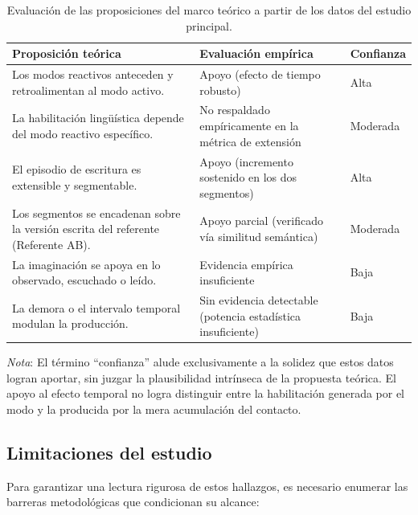 \documentclass[12pt]{article}
\begin{document}
	\begin{table}[htbp]
		\centering
		\caption{Evaluación de las proposiciones del marco teórico a partir de los datos del estudio principal.}
		\label{tab:matriz_principal}
		\small
		\begin{tabular}{p{} p{} p{}}
			\toprule
			\textbf{Proposición teórica} & \textbf{Evaluación empírica} & \textbf{Confianza} \\
			\midrule
			Los modos reactivos anteceden y retroalimentan al modo activo. &
			Apoyo (efecto de tiempo robusto) & Alta \\[2pt]
			La habilitación lingüística depende del modo reactivo específico. &
			No respaldado empíricamente en la métrica de extensión & Moderada \\[2pt]
			El episodio de escritura es extensible y segmentable. &
			Apoyo (incremento sostenido en los dos segmentos) & Alta \\[2pt]
			Los segmentos se encadenan sobre la versión escrita del referente (Referente AB). &
			Apoyo parcial (verificado vía similitud semántica) & Moderada \\[2pt]
			La imaginación se apoya en lo observado, escuchado o leído. &
			Evidencia empírica insuficiente & Baja \\[2pt]
			La demora o el intervalo temporal modulan la producción. &
			Sin evidencia detectable (potencia estadística insuficiente) & Baja \\
			\bottomrule
		\end{tabular}
		\smallskip
		\emph{Nota}: El término ``confianza'' alude exclusivamente a la solidez que estos datos logran aportar, sin juzgar la plausibilidad intrínseca de la propuesta teórica. El apoyo al efecto temporal no logra distinguir entre la habilitación generada por el modo y la producida por la mera acumulación del contacto.
	\end{table}
	
	\subsection{Limitaciones del estudio}
	
	Para garantizar una lectura rigurosa de estos hallazgos, es necesario enumerar las barreras metodológicas que condicionan su alcance:
	
\end{document}
